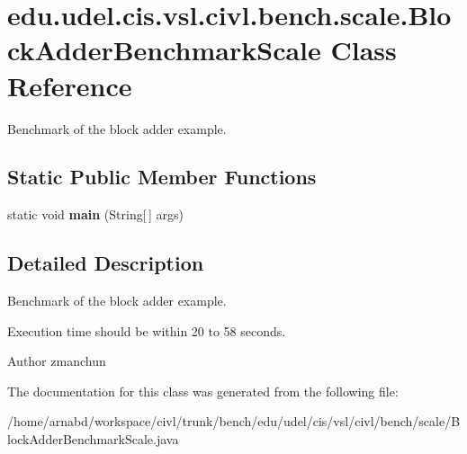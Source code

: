 \hypertarget{classedu_1_1udel_1_1cis_1_1vsl_1_1civl_1_1bench_1_1scale_1_1BlockAdderBenchmarkScale}{}\section{edu.\+udel.\+cis.\+vsl.\+civl.\+bench.\+scale.\+Block\+Adder\+Benchmark\+Scale Class Reference}
\label{classedu_1_1udel_1_1cis_1_1vsl_1_1civl_1_1bench_1_1scale_1_1BlockAdderBenchmarkScale}


Benchmark of the block adder example.  


\subsection*{Static Public Member Functions}
\begin{DoxyCompactItemize}
\item 
\hypertarget{classedu_1_1udel_1_1cis_1_1vsl_1_1civl_1_1bench_1_1scale_1_1BlockAdderBenchmarkScale_a9e99a6f7d70d51faf38967b6033d6c05}{}static void {\bfseries main} (String\mbox{[}$\,$\mbox{]} args)\label{classedu_1_1udel_1_1cis_1_1vsl_1_1civl_1_1bench_1_1scale_1_1BlockAdderBenchmarkScale_a9e99a6f7d70d51faf38967b6033d6c05}

\end{DoxyCompactItemize}


\subsection{Detailed Description}
Benchmark of the block adder example. 

Execution time should be within 20 to 58 seconds.

\begin{DoxyAuthor}{Author}
zmanchun 
\end{DoxyAuthor}


The documentation for this class was generated from the following file\+:\begin{DoxyCompactItemize}
\item 
/home/arnabd/workspace/civl/trunk/bench/edu/udel/cis/vsl/civl/bench/scale/Block\+Adder\+Benchmark\+Scale.\+java\end{DoxyCompactItemize}
